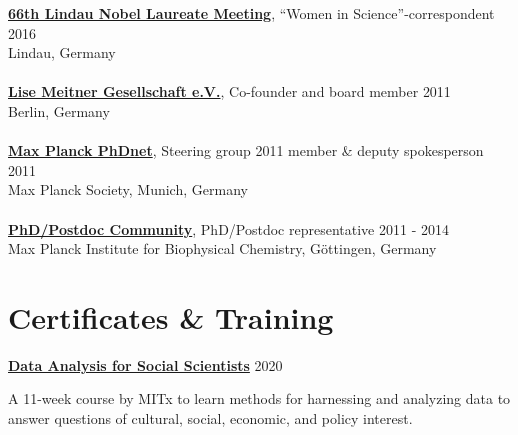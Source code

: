 \documentclass[margin,line]{res}
\begin{document}
\begin{resume}
{\bf \href{https://www.br.de/fernsehen/ard-alpha/sendungen/alpha-forum/alpha-forum-extra-spitzenforschung-102.html}{66th Lindau Nobel Laureate Meeting}}, “Women in Science”-correspondent \hfill {2016}\\
Lindau, Germany\\
\vspace*{-3mm}\\
{\bf \href{https://www.lise-meitner-gesellschaft.org/}{Lise Meitner Gesellschaft e.V.}}, Co-founder and board member \hfill {2011}\\
Berlin, Germany\\
\vspace*{-3mm}\\
{\bf \href{https://www.phdnet.mpg.de/home}{Max Planck PhDnet}}, Steering group 2011 member \& deputy spokesperson \hfill {2011}\\
Max Planck Society, Munich, Germany\\
\vspace*{-3mm}\\
{\bf  \href{https://www.mpibpc.mpg.de/phdcom}{PhD/Postdoc Community}}, PhD/Postdoc representative \hfill {2011 - 2014}\\
Max Planck Institute for Biophysical Chemistry, Göttingen, Germany\\


\section{\sc Certificates \& Training}

%

{\bf \href{https://www.edx.org/course/data-analysis-for-social-scientists}{Data Analysis for Social Scientists}} \hfill {2020}\\
\vspace*{-3.5mm}
\begin{addmargin}[0pt]{.1\linewidth}
\vspace*{-1mm}
A 11-week course by MITx to learn methods for harnessing and analyzing data to answer questions of cultural, social, economic, and policy interest.
\end{addmargin}


\end{resume}
\end{document}
